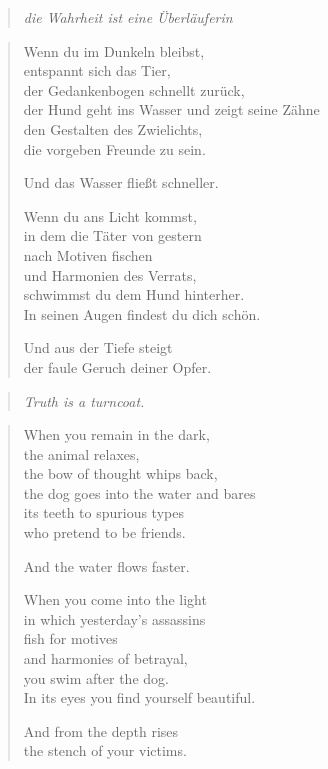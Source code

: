 
\cleartoverso


\begin{quote}
\itshape
die Wahrheit ist eine Überläuferin

\end{quote}

\begin{verse}

Wenn du im Dunkeln bleibst,\\
entspannt sich das Tier,\\
der Gedankenbogen schnellt zurück,\\
der Hund geht ins Wasser und zeigt seine Zähne\\
den Gestalten des Zwielichts,\\
die vorgeben Freunde zu sein.

Und das Wasser fließt schneller.

Wenn du ans Licht kommst,\\
in dem die Täter von gestern\\
nach Motiven fischen\\
und Harmonien des Verrats,\\
schwimmst du dem Hund hinterher.\\
In seinen Augen findest du dich schön.

Und aus der Tiefe steigt\\
der faule Geruch deiner Opfer.

\end{verse}

\clearpage


\begin{quote}
\itshape
Truth is a turncoat.

\end{quote}

\begin{verse}

When you remain in the dark,\\
the animal relaxes,\\
the bow of thought whips back,\\
the dog goes into the water and bares\\
its teeth to spurious types\\
who pretend to be friends.

And the water flows faster.

When you come into the light\\
in which yesterday's assassins\\
fish for motives\\
and harmonies of betrayal,\\
you swim after the dog.\\
In its eyes you find yourself beautiful.

And from the depth rises\\
the stench of your victims.

\end{verse}

